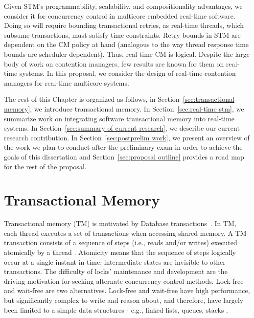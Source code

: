 \documentclass[12pt,english]{report}
\begin{document}
Given STM's programmability, scalability, and compositionality advantages, we consider it for concurrency control in multicore embedded real-time software. Doing so will require bounding transactional  retries, as real-time threads, which subsume transactions, must satisfy time constraints.  Retry bounds in STM are dependent on the CM policy at hand (analogous to the way thread response time bounds are scheduler-dependent). Thus, real-time CM is logical. Despite the large body of work on contention managers, few results are known for them on real-time systems. In this proposal, we consider the design of real-time contention managers for real-time multicore systems.

The rest of this Chapter is organized as follows, in Section~\ref{sec:transactional memory}, we introduce transactional memory. In Section~\ref{sec:real-time stm}, we summarize work on integrating software transactional memory into real-time systems. In Section~\ref{sec:summary of current research}, we describe our current research contribution. In Section~\ref{sec:postprelim work}, we present an overview of the work we plan to conduct after the preliminary exam in order to achieve the goals of this dissertation and Section~\ref{sec:proposal outline} provides a road map for the rest of the proposal.

\section{\label{sec:transactional memory}Transactional Memory}

Transactional memory (TM) is motivated by Database transactions~\cite{Gray:1981:TCV:1286831.1286846}.
In TM, each thread executes a set of transactions when accessing shared memory. A TM transaction consists of a sequence
of steps (i.e., reads and/or writes) executed atomically by a thread \cite{tm-book10}. Atomicity
means that the sequence of steps logically occur at a single instant in time; intermediate states are
invisible to other transactions. The difficulty of locks' maintenance and development are the driving motivation for seeking alternate concurrency control methods.
Lock-free and wait-free are two alternatives. Lock-free and wait-free have high performance, but significantly
complex to write and reason about, and therefore, have largely been
limited to a simple data structures - e.g., linked lists,
queues, stacks \cite{1508449,4079519,1656921,Cho:2006:UAP:1141277.1141490}.
\end{document}
